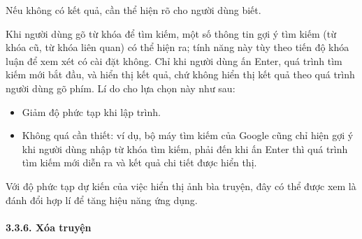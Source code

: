 \documentclass[
]{article}
\providecommand{\tightlist}{%
  \setlength{\itemsep}{0pt}\setlength{\parskip}{0pt}}
\begin{document}
Nếu không có kết quả, cần thể hiện rõ cho người dùng biết.

Khi người dùng gõ từ khóa để tìm kiếm, một số thông tin gợi ý tìm kiếm
(từ khóa cũ, từ khóa liên quan) có thể hiện ra; tính năng này tùy theo
tiến độ khóa luận để xem xét có cài đặt không. Chỉ khi người dùng ấn
Enter, quá trình tìm kiếm mới bắt đầu, và hiển thị kết quả, chứ không
hiển thị kết quả theo quá trình người dùng gõ phím. Lí do cho lựa chọn
này như sau:

\begin{itemize}
\tightlist
\item
  Giảm độ phức tạp khi lập trình.
\item
  Không quá cần thiết: ví dụ, bộ máy tìm kiếm của Google cũng chỉ hiện
  gợi ý khi người dùng nhập từ khóa tìm kiếm, phải đến khi ấn Enter thì
  quá trình tìm kiếm mới diễn ra và kết quả chi tiết được hiển thị.
\end{itemize}

Với độ phức tạp dự kiến của việc hiển thị ảnh bìa truyện, đây có thể
được xem là đánh đổi hợp lí để tăng hiệu năng ứng dụng.

\hypertarget{xuxf3a-truyux1ec7n}{%
\paragraph{\texorpdfstring{3.3.6. Xóa truyện
}{3.3.6. Xóa truyện }}\label{xuxf3a-truyux1ec7n}}
\end{document}
